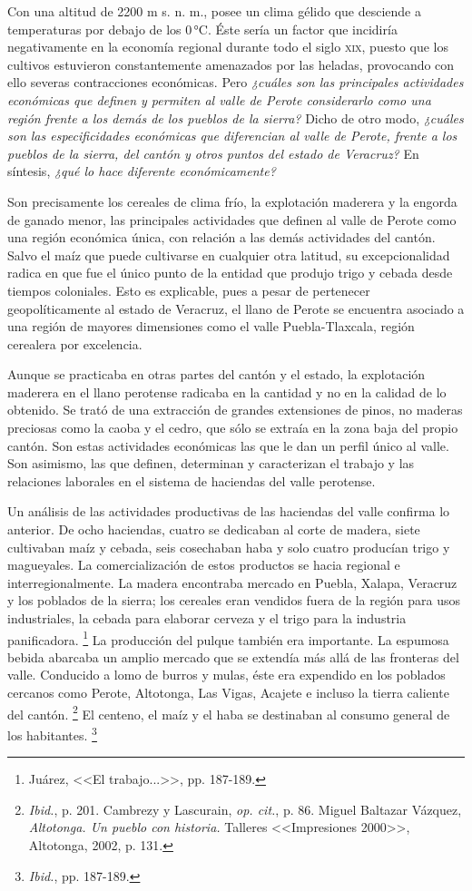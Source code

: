 \documentclass[14pt,twoside,final]{extbook} %
\let\oldfootnote\footnote
\renewcommand\footnote[1]{%
\oldfootnote{\hspace{1mm}#1}}
\begin{document}
Con una altitud de 2200 m s. n. m., posee un clima gélido que desciende a temperaturas por debajo de los 0\,°C. Éste sería un factor que incidiría negativamente en la economía regional durante todo el siglo \textsc{xix}, puesto que los cultivos estuvieron constantemente amenazados por las heladas, provocando con ello severas contracciones económicas. Pero \emph{¿cuáles son las principales
actividades económicas que definen y permiten al valle de Perote considerarlo como una región frente a los demás de los pueblos de la sierra?} Dicho de otro modo, \emph{¿cuáles son las especificidades económicas que diferencian al valle de Perote, frente a los pueblos de la sierra, del cantón y otros puntos del estado de Veracruz?} En síntesis, \emph{¿qué lo hace diferente económicamente?}

Son precisamente los cereales de clima frío, la explotación maderera y la engorda de ganado menor, las principales actividades que definen al valle de Perote como una región económica única, con relación a las demás actividades del cantón. Salvo el maíz que puede cultivarse en cualquier otra latitud, su excepcionalidad radica en que fue el único punto de la entidad que produjo trigo y cebada desde tiempos coloniales. Esto es explicable, pues a pesar de pertenecer geopolíticamente al estado de Veracruz, el llano de Perote se encuentra asociado a una región de mayores dimensiones como el valle Puebla-Tlaxcala, región cerealera por excelencia.

Aunque se practicaba en otras partes del cantón y el estado, la explotación maderera en el llano perotense radicaba en la cantidad y no en la calidad de lo obtenido. Se trató de una extracción de grandes extensiones de pinos, no maderas preciosas como la caoba y el cedro, que sólo se extraía en la zona baja del propio cantón. Son estas actividades económicas las que le dan un perfil único al valle. Son asimismo, las que definen, determinan y caracterizan el trabajo y las relaciones laborales en el sistema de haciendas del valle perotense.

Un análisis de las actividades productivas de las haciendas del valle confirma lo anterior. De ocho haciendas, cuatro se dedicaban al corte de madera, siete cultivaban maíz y cebada, seis cosechaban haba y solo cuatro producían trigo y magueyales. La comercialización de estos productos se hacia regional e interregionalmente. La madera encontraba mercado en Puebla, Xalapa, Veracruz y los poblados de la sierra; los cereales eran vendidos fuera de la región para usos industriales, la cebada para elaborar cerveza y el trigo para la industria panificadora.\footnote{Juárez, <<El trabajo...>>, pp. 187-189.} La producción del pulque también era importante. La espumosa bebida abarcaba un amplio mercado que se extendía más allá de las fronteras del valle. Conducido a lomo de burros y mulas, éste era expendido en los poblados cercanos como Perote, Altotonga, Las Vigas, Acajete e incluso la tierra caliente del cantón.\footnote{\emph{Ibid.}, p. 201. Cambrezy y Lascurain, \emph{op. cit.}, p. 86. Miguel Baltazar Vázquez, \emph{Altotonga. Un pueblo con historia.} Talleres <<Impresiones 2000>>, Altotonga, 2002, p. 131.} El centeno, el maíz y el haba se destinaban al consumo general de los habitantes.\footnote{\emph{Ibid.}, pp. 187-189.}
\end{document}
